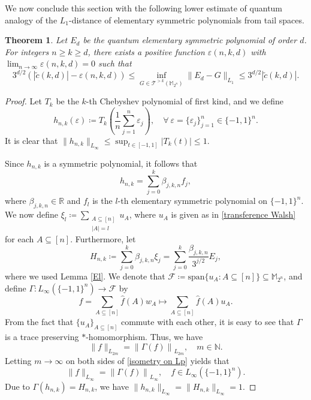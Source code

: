 \documentclass{amsbook}
\newtheorem{theorem}{Theorem}[chapter]
\theoremstyle{definition}
\theoremstyle{remark}
\numberwithin{section}{chapter}
\numberwithin{equation}{chapter}
\newcommand{\M}{\mathbb{M}}
\newcommand{\1}{\mathbf{1}}
\begin{document}
We now conclude this section with the following lower estimate of quantum analogy of the $L_{1}$-distance of elementary symmetric polynomials from tail spaces.
\begin{theorem}
Let $E_d$ be the quantum elementary symmetric polynomial of order $d$.  For integers $n\geq k\geq d$, there exists a positive function $\varepsilon(n,k,d)$ with $\lim_{n\to \infty}\varepsilon(n,k,d)=0$ such that
\[
3^{d/2}\left(|\tilde{c}(k,d)|-\varepsilon(n,k,d)\right)\leq \inf_{G\in \mathcal{T}^{>k}(\M_{2^n})}\|E_{d}-G\|_{L_{1}}\leq 3^{d/2} |\tilde{c}(k,d)|.
\]
\end{theorem}
\begin{proof}
Let $T_{k}$ be the $k$-th Chebyshev polynomial of first kind, and we define
\[
h_{n,k}(\varepsilon)\coloneqq T_{k}\left(\frac{1}{n}\sum_{j=1}^{n}\varepsilon_{j}\right),\quad\forall~\varepsilon=\{\varepsilon_{j}\}_{j=1}^{n}\in\{-1,1\}^{n}.
\]
It is clear that $\|h_{n,k}\|_{L_{\infty}}\leq \sup_{t\in[-1,1]}|T_{k}(t)|\leq 1$.

Since $h_{n,k}$ is a symmetric polynomial, it follows that
\begin{equation}\label{auxiliary function 1}
h_{n,k}=\sum_{j=0}^{k}\beta_{j,k,n}f_{j},
\end{equation}
where $\beta_{j,k,n}\in \mathbb{R}$ and $f_{l}$ is the $l$-th elementary symmetric polynomial on $\{-1,1\}^{n}$. We now define $\xi_{l}\coloneqq \sum_{\substack{A\subseteq [n]\\|A|=l}}u_{A}$, where $u_{A}$ is given as in \eqref{transference Walsh} for each $A\subseteq [n]$. Furthermore, let
\[
H_{n,k}\coloneqq \sum_{j=0}^{k}\beta_{j,k,n}\xi_{j}=\sum_{j=0}^{k}\frac{\beta_{j,k,n}}{3^{j/2}}E_{j},
\]
where we used Lemma \ref{El}. 
We denote that $\mathcal{F}\coloneqq \mathrm{span}\{u_{A}:A\subseteq [n]\}\subseteq \mathbb{M}_{2^n}$, and define $\Gamma: L_{\infty}(\{-1,1\}^{n})\to \mathcal{F}$ by
\[
f=\sum_{A\subseteq [n]}\widehat{f}(A)w_{A}\mapsto \sum_{A\subseteq [n]}\widehat{f}(A)u_{A}.
\]
From the fact that $\{u_{A}\}_{A\subseteq [n]}$ commute with each other, it is easy to see that $\Gamma$ is a trace preserving $*$-homomorphism. Thus, we have
\begin{equation}\label{isometry on Lp}
\|f\|_{L_{2m}}=\left\|\Gamma(f)\right\|_{L_{2m}},\quad m\in \mathbb{N}.
\end{equation}
Letting $m\to \infty$ on both sides of \eqref{isometry on Lp} yields that
\[
\|f\|_{L_{\infty}}=\left\|\Gamma(f)\right\|_{L_{\infty}},\quad f\in L_{\infty}(\{-1,1\}^{n}).
\]
Due to $\Gamma(h_{n,k})=H_{n,k}$, we have $\|h_{n,k}\|_{L_{\infty}}=\|H_{n,k}\|_{L_{\infty}}=1$.




\end{proof}
\end{document}
